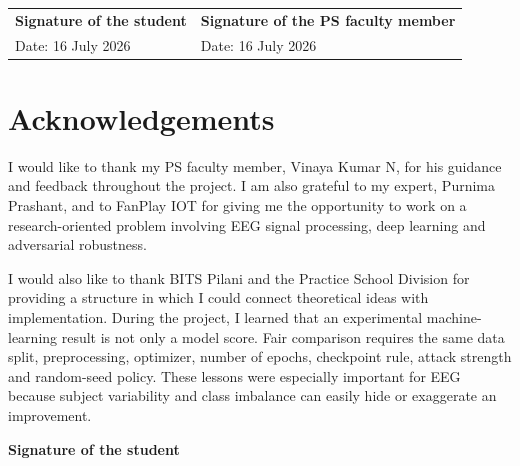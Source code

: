 \documentclass[10pt,a4paper,openright]{report}
\begin{document}
\vfill
\begin{tabularx}{\textwidth}{X X}
\textbf{Signature of the student} & \textbf{Signature of the PS faculty member} \\[0.75cm]
Date: 16 July 2026 & Date: 16 July 2026
\end{tabularx}
\normalsize
\clearpage

\chapter*{Acknowledgements}
\par\noindent
I would like to thank my PS faculty member, Vinaya Kumar N, for his guidance and feedback throughout the project. I am also grateful to my expert, Purnima Prashant, and to FanPlay IOT for giving me the opportunity to work on a research-oriented problem involving EEG signal processing, deep learning and adversarial robustness.

\par\noindent
I would also like to thank BITS Pilani and the Practice School Division for providing a structure in which I could connect theoretical ideas with implementation. During the project, I learned that an experimental machine-learning result is not only a model score. Fair comparison requires the same data split, preprocessing, optimizer, number of epochs, checkpoint rule, attack strength and random-seed policy. These lessons were especially important for EEG because subject variability and class imbalance can easily hide or exaggerate an improvement.

\vfill
\hfill\textbf{Signature of the student}
\clearpage

\null\thispagestyle{plain}\clearpage

\tableofcontents
\clearpage

\null\thispagestyle{plain}\clearpage

\listoffigures
\clearpage

\null\thispagestyle{plain}\clearpage

\listoftables
\clearpage

\null\thispagestyle{plain}\clearpage

\end{document}
